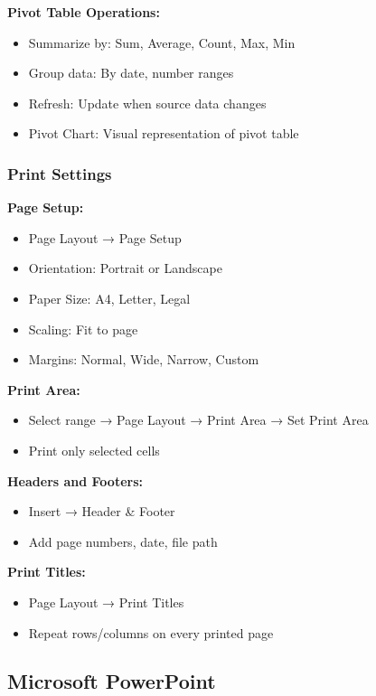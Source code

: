 \documentclass[12pt,a4paper]{article}
\begin{document}
\textbf{Pivot Table Operations:}
\begin{itemize}
    \item Summarize by: Sum, Average, Count, Max, Min
    \item Group data: By date, number ranges
    \item Refresh: Update when source data changes
    \item Pivot Chart: Visual representation of pivot table
\end{itemize}

\subsubsection{Print Settings}

\textbf{Page Setup:}
\begin{itemize}
    \item Page Layout → Page Setup
    \item Orientation: Portrait or Landscape
    \item Paper Size: A4, Letter, Legal
    \item Scaling: Fit to page
    \item Margins: Normal, Wide, Narrow, Custom
\end{itemize}

\textbf{Print Area:}
\begin{itemize}
    \item Select range → Page Layout → Print Area → Set Print Area
    \item Print only selected cells
\end{itemize}

\textbf{Headers and Footers:}
\begin{itemize}
    \item Insert → Header \& Footer
    \item Add page numbers, date, file path
\end{itemize}

\textbf{Print Titles:}
\begin{itemize}
    \item Page Layout → Print Titles
    \item Repeat rows/columns on every printed page
\end{itemize}

\subsection{Microsoft PowerPoint}
\end{document}
